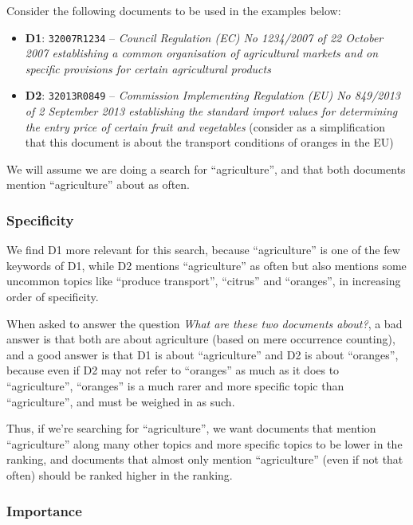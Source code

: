 \documentclass[sigconf, authorversion]{acmart}
\begin{document}
Consider the following documents to be used in the examples below:
\begin{itemize}
    \item \textbf{D1}: \texttt{32007R1234} -- \textit{Council Regulation (EC) No 1234/2007 of 22 October 2007 establishing a common organisation of agricultural markets and on specific provisions for certain agricultural products}
    \item \textbf{D2}: \texttt{32013R0849} -- \textit{Commission Implementing Regulation (EU) No 849/2013 of 2 September 2013 establishing the standard import values for determining the entry price of certain fruit and vegetables} (consider as a simplification that this document is about the transport conditions of oranges in the EU)
\end{itemize}

We will assume we are doing a search for ``agriculture'', and that both documents mention ``agriculture'' about as often.

\subsubsection{Specificity}

We find D1 more relevant for this search, because ``agriculture'' is one of the few keywords of D1, while D2 mentions ``agriculture'' as often but also mentions some uncommon topics like ``produce transport'', ``citrus'' and ``oranges'', in increasing order of specificity.

When asked to answer the question \textit{What are these two documents about?}, a bad answer is that both are about agriculture (based on mere occurrence counting), and a good answer is that D1 is about ``agriculture'' and D2 is about ``oranges'', because even if D2 may not refer to ``oranges'' as much as it does to ``agriculture'', ``oranges'' is a much rarer and more specific topic than ``agriculture'', and must be weighed in as such.

Thus, if we're searching for ``agriculture'', we want documents that mention ``agriculture'' along many other topics and more specific topics to be lower in the ranking, and documents that almost only mention ``agriculture'' (even if not that often) should be ranked higher in the ranking.

\subsubsection{Importance}
\end{document}
